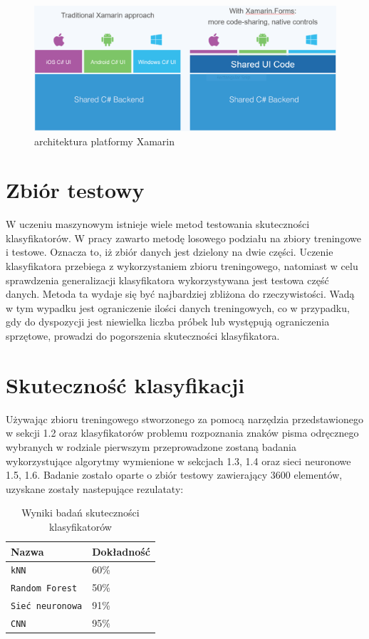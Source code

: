 \documentclass[brudnopis]{xmgr}
\begin{document}
\begin{figure}[!tbh]
\centering
\includegraphics[width=1.2\hsize]{fig/xamarin}
\caption{architektura platformy Xamarin}
\end{figure}
\newpage

\section{Zbiór testowy}

W uczeniu maszynowym istnieje wiele metod testowania skuteczności klasyfikatorów. W pracy zawarto metodę losowego podziału na zbiory treningowe i testowe. Oznacza to, iż zbiór danych jest dzielony na dwie części. Uczenie klasyfikatora przebiega z wykorzystaniem zbioru treningowego, natomiast w celu sprawdzenia generalizacji klasyfikatora wykorzystywana jest testowa część danych. Metoda ta wydaje się być najbardziej zbliżona do rzeczywistości. Wadą w tym wypadku jest ograniczenie ilości danych treningowych, co w przypadku, gdy do dyspozycji jest niewielka liczba próbek lub występują ograniczenia sprzętowe, prowadzi do pogorszenia skuteczności klasyfikatora.

\section{Skuteczność klasyfikacji}

Używając zbioru treningowego stworzonego za pomocą narzędzia przedstawionego w sekcji 1.2 oraz klasyfikatorów problemu rozpoznania znaków pisma odręcznego wybranych w rodziale pierwszym przeprowadzone zostaną badania wykorzystujące algorytmy wymienione w sekcjach 1.3, 1.4 oraz sieci neuronowe 1.5, 1.6. Badanie zostało oparte o zbiór testowy zawierający 3600 elementów, uzyskane zostały  nastepujące rezulataty: 

\begin{table}[!htb]
\begin{tabular}{|l|l|} \hline
Nazwa & Dokładność \\ \hline
\texttt{kNN} & 60\% \\ \hline
\texttt{Random Forest} & 50\% \\ \hline
\texttt{Sieć neuronowa} & 91\% \\ \hline
\texttt{CNN}     & 95\% \\ \hline
\end{tabular}
\caption{Wyniki badań skuteczności klasyfikatorów}
\end{table}
\end{document}
